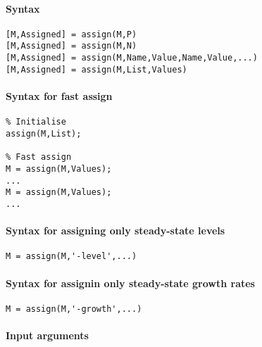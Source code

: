


	\paragraph{Syntax}

\begin{verbatim}
[M,Assigned] = assign(M,P)
[M,Assigned] = assign(M,N)
[M,Assigned] = assign(M,Name,Value,Name,Value,...)
[M,Assigned] = assign(M,List,Values)
\end{verbatim}

\paragraph{Syntax for fast assign}

\begin{verbatim}
% Initialise
assign(M,List);

% Fast assign
M = assign(M,Values);
...
M = assign(M,Values);
...
\end{verbatim}

\paragraph{Syntax for assigning only steady-state
levels}

\begin{verbatim}
M = assign(M,'-level',...)
\end{verbatim}

\paragraph{Syntax for assignin only steady-state growth
rates}

\begin{verbatim}
M = assign(M,'-growth',...)
\end{verbatim}

\paragraph{Input arguments}

